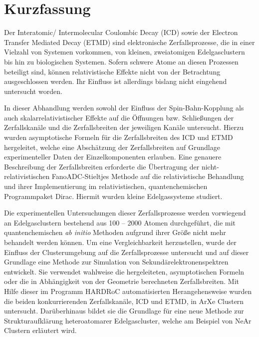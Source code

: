 \chapter*{Kurzfassung}
\thispagestyle{empty}

Der Interatomic/ Intermolecular Coulombic Decay (ICD) sowie der
Electron Transfer Mediated Decay (ETMD) sind elektronische Zerfallsprozesse,
die in einer Vielzahl von Systemen vorkommen, von kleinen, zweiatomigen
Edelgasclustern bis hin zu biologischen Systemen. Sofern schwere Atome
an diesen Prozessen beteiligt sind, können rela\-ti\-vis\-ti\-sche Effekte
nicht von der Betrachtung ausgeschlossen werden. Ihr Einfluss ist allerdings
bislang nicht eingehend untersucht worden.

In dieser Abhandlung werden sowohl der Einfluss der Spin-Bahn-Kopplung
als auch skalarrelativistischer Effekte auf die Öffnungen bzw.
Schließungen der Zerfallskanäle und die Zerfallsbreiten
der jeweiligen Kanäle untersucht.
Hierzu wurden asymptotische Formeln für die Zerfallsbreiten des ICD und ETMD
hergeleitet, welche eine Abschätzung der Zerfallsbreiten auf Grundlage
experimenteller Daten der Einzelkomponenten erlauben.
Eine genauere Beschreibung der Zerfallsbreiten erforderte die Übertragung
der nicht-relativistischen FanoADC-Stieltjes Methode auf die relativistische
Behandlung und ihrer Implementierung im relativistischen, quan\-ten\-chemi\-schen
Programmpaket Dirac. Hiermit wurden kleine Edelgassysteme studiert.

Die experimentellen Untersuchungen dieser Zerfallsprozesse werden vorwiegend an
Edelgasclustern bestehend aus 100 -- 2000 Atomen durchgeführt, die mit
quantenchemischen \emph{ab initio} Methoden aufgrund ihrer Größe
nicht mehr behandelt werden können.
Um eine Vergleichbarkeit herzustellen, wurde der Einfluss der Clusterumgebung
auf die Zerfallsprozesse untersucht und auf dieser Grundlage eine
Methode zur Simulation von Sekundärelektronenspektren entwickelt. Sie
verwendet wahlweise die hergeleiteten, asymptotischen Formeln oder die
in Abhängigkeit von der Geometrie berechneten Zerfallsbreiten. Mit Hilfe dieser
im Programm HARDRoC automatisierten Herangehensweise wurden die beiden
konkurrierenden
Zerfallskanäle, ICD und ETMD, in ArXe Clustern untersucht. Darüberhinaus
bildet sie die Grundlage für eine neue Methode zur Strukturaufklärung
heteroatomarer Edelgascluster, welche am Beispiel von NeAr Clustern
erläutert wird.
